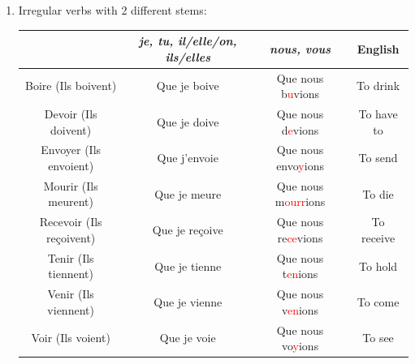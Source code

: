 \documentclass{book}
\begin{document}
\begin{enumerate}
            \item Irregular verbs with 2 different stems:
                \begin{center}
                    \begin{tabular}{|c|c|c|c|}
                        \hline
                        & \textit{je, tu, il/elle/on, ils/elles} & \textit{nous, vous} & \textbf{English} \\
                        \hline
                        Boire (Ils boivent) & Que je boive & Que nous b\textcolor{red}{u}vions & To drink \\
                        \hline
                        Devoir (Ils doivent) & Que je doive & Que nous d\textcolor{red}{e}vions & To have to \\
                        \hline
                        Envoyer (Ils envoient) & Que j'envoie & Que nous envo\textcolor{red}{y}ions & To send \\
                        \hline
                        Mourir (Ils meurent) & Que je meure & Que nous m\textcolor{red}{ourr}ions & To die \\
                        \hline
                        Recevoir (Ils reçoivent) & Que je reçoive & Que nous re\textcolor{red}{ce}vions & To receive \\
                        \hline
                        Tenir (Ils tiennent) & Que je tienne & Que nous t\textcolor{red}{en}ions & To hold \\
                        \hline
                        Venir (Ils viennent) & Que je vienne & Que nous v\textcolor{red}{en}ions & To come \\
                        \hline
                        Voir (Ils voient) & Que je voie & Que nous vo\textcolor{red}{y}ions & To see \\
                        \hline
                    \end{tabular}
                \end{center}
            

\end{enumerate}
\end{document}
